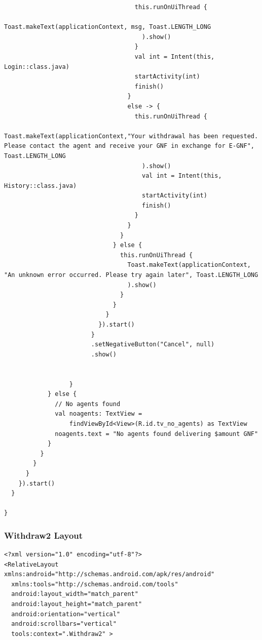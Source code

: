\documentclass[11pt, a4paper]{article}
\begin{document}
\begin{appendices}
\begin{lstlisting}
                                    this.runOnUiThread {
                                      Toast.makeText(applicationContext, msg, Toast.LENGTH_LONG
                                      ).show()
                                    }
                                    val int = Intent(this, Login::class.java)
                                    startActivity(int)
                                    finish()
                                  }
                                  else -> {
                                    this.runOnUiThread {
                                      Toast.makeText(applicationContext,"Your withdrawal has been requested. Please contact the agent and receive your GNF in exchange for E-GNF", Toast.LENGTH_LONG
                                      ).show()
                                      val int = Intent(this, History::class.java)
                                      startActivity(int)
                                      finish()
                                    }
                                  }
                                }
                              } else {
                                this.runOnUiThread {
                                  Toast.makeText(applicationContext, "An unknown error occurred. Please try again later", Toast.LENGTH_LONG
                                  ).show()
                                }
                              }
                            }
                          }).start()
                        }
                        .setNegativeButton("Cancel", null)
                        .show()


                  }
            } else {
              // No agents found
              val noagents: TextView =
                  findViewById<View>(R.id.tv_no_agents) as TextView
              noagents.text = "No agents found delivering $amount GNF"
            }
          }
        }
      }
    }).start()
  }

}
\end{lstlisting}
\subsubsection{Withdraw2 Layout}
\begin{lstlisting}
<?xml version="1.0" encoding="utf-8"?>
<RelativeLayout xmlns:android="http://schemas.android.com/apk/res/android"
  xmlns:tools="http://schemas.android.com/tools"
  android:layout_width="match_parent"
  android:layout_height="match_parent"
  android:orientation="vertical"
  android:scrollbars="vertical"
  tools:context=".Withdraw2" >



\end{lstlisting}
\end{appendices}
\end{document}
